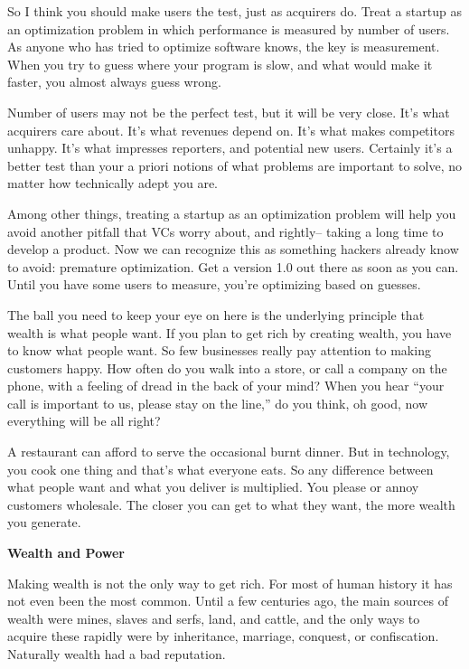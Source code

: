 So I think you should make users the test, just as acquirers do. Treat a
startup as an optimization problem in which performance is measured by
number of users. As anyone who has tried to optimize software knows, the
key is measurement. When you try to guess where your program is slow,
and what would make it faster, you almost always guess wrong.

Number of users may not be the perfect test, but it will be very close.
It's what acquirers care about. It's what revenues depend on. It's what
makes competitors unhappy. It's what impresses reporters, and potential
new users. Certainly it's a better test than your a priori notions of
what problems are important to solve, no matter how technically adept
you are.

Among other things, treating a startup as an optimization problem will
help you avoid another pitfall that VCs worry about, and rightly--
taking a long time to develop a product. Now we can recognize this as
something hackers already know to avoid: premature optimization. Get a
version 1.0 out there as soon as you can. Until you have some users to
measure, you're optimizing based on guesses.

The ball you need to keep your eye on here is the underlying principle
that wealth is what people want. If you plan to get rich by creating
wealth, you have to know what people want. So few businesses really pay
attention to making customers happy. How often do you walk into a store,
or call a company on the phone, with a feeling of dread in the back of
your mind? When you hear ``your call is important to us, please stay on
the line,'' do you think, oh good, now everything will be all right?

A restaurant can afford to serve the occasional burnt dinner. But in
technology, you cook one thing and that's what everyone eats. So any
difference between what people want and what you deliver is multiplied.
You please or annoy customers wholesale. The closer you can get to what
they want, the more wealth you generate.

\textbf{Wealth and Power}

Making wealth is not the only way to get rich. For most of human history
it has not even been the most common. Until a few centuries ago, the
main sources of wealth were mines, slaves and serfs, land, and cattle,
and the only ways to acquire these rapidly were by inheritance,
marriage, conquest, or confiscation. Naturally wealth had a bad
reputation.

